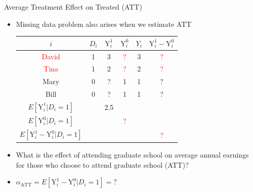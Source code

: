 \documentclass[hyperref={pdfpagelabels=false}]{beamer}
\begin{document}
\begin{frame}{Average Treatment Effect on Treated (ATT)}
\begin{itemize}
\item Missing data problem also arises when we estimate ATT
\vspace{0.2cm} 
\begin{center}
	\begin{threeparttable}
		\centering\footnotesize
		\begin{tabular}{cccccc}
			\toprule
			$i$ & $D_i$ & $\mathrm{Y}^{1}_{i}$ & $\mathrm{Y}^{0}_{i}$ & $Y_i$ & $\mathrm{Y}^{1}_{i}-\mathrm{Y}^{0}_{i}$  \\
			\midrule
			\textcolor{red}{David} & 1 & 3 & \textcolor{red}? & 3 & \textcolor{red}? \\
			\textcolor{red}{Tina} & 1 & 2 & \textcolor{red}? & 2 & \textcolor{red}? \\
			Mary & 0 & ? & 1 & 1 & ? \\
			Bill & 0 & ? & 1 & 1 & ? \\
			\midrule
			$E[\mathrm{Y}^{1}_{i} | D_i=1]$     &  & 2.5 &     &  &     \\
			$E[\mathrm{Y}^{0}_{i} | D_i=1]$     &     & & \textcolor{red}? &  &     \\
			\midrule
			$E[\mathrm{Y}^{1}_{i} - \mathrm{Y}^{0}_{i} | D_i=1]$ &     &     &  &  & \textcolor{red}? \\
			\bottomrule
		\end{tabular}
	\end{threeparttable}
\end{center}

\vspace{0.2cm}
\item What is the effect of attending graduate school on average annual earnings for those who choose to attend graduate school (ATT)?
\vspace{0.2cm}
\item $\alpha_{\text{ATT}}=E[\mathrm{Y}^{1}_{i} - \mathrm{Y}^{0}_{i} | D_i=1]=?$
\end{itemize}

\end{frame}
\end{document}
